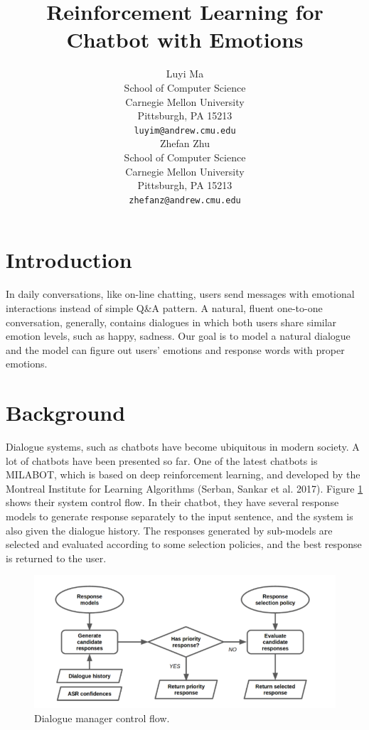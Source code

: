 \documentclass{article}
\title{Reinforcement Learning for Chatbot with Emotions}
\author{
  Luyi Ma \\
  School of Computer Science\\
  Carnegie Mellon University\\
  Pittsburgh, PA 15213 \\
  \texttt{luyim@andrew.cmu.edu} \\
  \And
  Zhefan Zhu \\
  School of Computer Science \\
  Carnegie Mellon University\\
  Pittsburgh, PA 15213 \\
  \texttt{zhefanz@andrew.cmu.edu} \\  
}
\begin{document}

\maketitle



\section{Introduction}
In daily conversations, like on-line chatting, users send messages with emotional interactions instead of simple Q\&A pattern. A natural, fluent one-to-one conversation, generally, contains dialogues in which both users share similar emotion levels, such as happy, sadness. Our goal is to model a natural dialogue and the model can figure out users' emotions and response words with proper emotions.


\section{Background}

Dialogue systems, such as chatbots have become ubiquitous in modern society. A lot of chatbots have been presented so far. One of the latest chatbots is MILABOT, which is based on deep reinforcement learning, and developed by the Montreal Institute for Learning Algorithms (Serban, Sankar et al. 2017). Figure \ref{fig:dialoguesystem} shows their system control flow. In their chatbot, they have several response models to generate response separately to the input sentence, and the system is also given the dialogue history. The responses generated by sub-models are selected and evaluated according to some selection policies, and the best response is returned to the user. \par 





\begin{figure}[!h]
\begin{center}
\includegraphics[scale=0.4]{figure1.png}
\caption{Dialogue manager control flow.}
\label{fig:dialoguesystem}
\end{center}
\end{figure}
\end{document}

